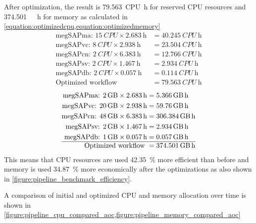 After optimization, the result is \SI{79.563}{CPU~\hour} for reserved CPU resources and \SI{374.501}{\giga\byte~\hour} for memory as calculated in \cref{equation:optimizedcpu,equation:optimizedmemory} 
\begin{equation}\label{equation:optimizedcpu}
    \begin{aligned}
        \text{megSAPma: }\SI{15}{CPU}\times\SI{2.683}{\hour} &= \SI{40.245}{CPU~\hour}\\
        \text{megSAPvc: }\SI{8}{CPU}\times\SI{2.938}{\hour} &= \SI{23.504}{CPU~\hour}\\
        \text{megSAPcn: }\SI{2}{CPU}\times\SI{6.383}{\hour} &= \SI{12.766}{CPU~\hour}\\
        \text{megSAPsv: }\SI{2}{CPU}\times\SI{1.467}{\hour} &= \SI{2.934}{CPU~\hour}\\
        \text{megSAPdb: }\SI{2}{CPU}\times\SI{0.057}{\hour} &= \SI{0.114}{CPU~\hour}\\
        \hline
        \text{Optimized workflow } &= \SI{79.563}{CPU~\hour}
    \end{aligned}
\end{equation}
\begin{equation}\label{equation:optimizedmemory}
    \begin{aligned}
        \text{megSAPma: }\SI{2}{\giga\byte}\times\SI{2.683}{\hour} &= \SI{5.366}{\giga\byte~\hour}\\
        \text{megSAPvc: }\SI{20}{\giga\byte}\times\SI{2.938}{\hour} &= \SI{59.76}{\giga\byte~\hour}\\
        \text{megSAPcn: }\SI{48}{\giga\byte}\times\SI{6.383}{\hour} &= \SI{306.384}{\giga\byte~\hour}\\
        \text{megSAPsv: }\SI{2}{\giga\byte}\times\SI{1.467}{\hour} &= \SI{2.934}{\giga\byte~\hour}\\
        \text{megSAPdb: }\SI{1}{\giga\byte}\times\SI{0.057}{\hour} &= \SI{0.057}{\giga\byte~\hour}\\
        \hline
        \text{Optimized workflow } &= \SI{374.501}{\giga\byte~\hour}
    \end{aligned}
\end{equation}
This means that CPU resources are used \SI{42.35}{\percent} more efficient than before and memory is used \SI{34.87}{\percent} more economically after the optimizations as also shown in \cref{figure:pipeline_benchmark_efficiency}. 

A comparison of initial and optimized CPU and memory allocation over time is shown in \cref{figure:pipeline_cpu_compared_aoc,figure:pipeline_memory_compared_aoc}

